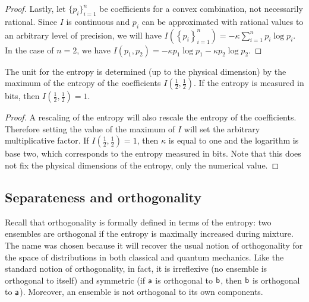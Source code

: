 \begin{mathSection}
\begin{proof}
	Lastly, let $\{p_i\}_{i=1}^{n}$ be coefficients for a convex combination, not necessarily rational. Since $I$ is continuous and $p_i$ can be approximated with rational values to an arbitrary level of precision, we will have $I\left(\left\{ p_i\right\}_{i=1}^{n}\right) = - \kappa \sum_{i=1}^{n} p_i \log p_i$. In the case of $n=2$, we have $I(p_1, p_2) = - \kappa p_1 \log p_1 - \kappa p_2 \log p_2$.	
\end{proof}

\begin{coro}
	The unit for the entropy is determined (up to the physical dimension) by the maximum of the entropy of the coefficients $I\left(\frac{1}{2}, \frac{1}{2}\right)$. If the entropy is measured in bits, then $I\left(\frac{1}{2}, \frac{1}{2}\right) = 1$.
\end{coro}

\begin{proof}
	A rescaling of the entropy will also rescale the entropy of the coefficients. Therefore setting the value of the maximum of $I$ will set the arbitrary multiplicative factor. If $I\left(\frac{1}{2}, \frac{1}{2}\right) = 1$, then $\kappa$ is equal to one and the logarithm is base two, which corresponds to the entropy measured in bits. Note that this does not fix the physical dimensions of the entropy, only the numerical value.
\end{proof}
\end{mathSection}

\subsection{Separateness and orthogonality}

Recall that orthogonality is formally defined in terms of the entropy: two ensembles are orthogonal if the entropy is maximally increased during mixture. The name was chosen because it will recover the usual notion of orthogonality for the space of distributions in both classical and quantum mechanics. Like the standard notion of orthogonality, in fact, it is irreflexive (no ensemble is orthogonal to itself) and symmetric (if $\ens[a]$ is orthogonal to $\ens[b]$, then $\ens[b]$ is orthogonal to $\ens[a]$). Moreover, an ensemble is not orthogonal to its own components.

